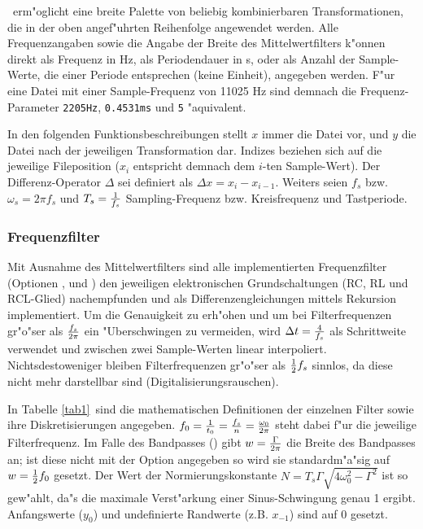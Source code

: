 \wflt\ erm"oglicht eine breite Palette von beliebig kombinierbaren 
Transformationen, die in der oben angef"uhrten Reihenfolge
angewendet werden. Alle Frequenzangaben sowie die Angabe der Breite
des Mittelwertfilters k"onnen direkt als Frequenz in Hz, 
als Periodendauer in s, oder als Anzahl der Sample-Werte, die
einer Periode entsprechen (keine Einheit), angegeben werden.
F"ur eine Datei mit einer Sample-Frequenz von 11025 Hz sind demnach
die Frequenz-Parameter {\tt 2205Hz}, {\tt 0.4531ms} und {\tt 5}
"aquivalent.

In den folgenden Funktionsbeschreibungen stellt $x$ immer die
Datei vor, und $y$ die Datei nach der jeweiligen Transformation dar.
Indizes beziehen sich auf die jeweilige Fileposition ($x_i$ 
entspricht demnach dem $i$-ten Sample-Wert). Der 
Differenz-Operator $\Delta$ sei definiert als $\Delta x = x_i - x_{i-1}$.
Weiters seien $f_s$ bzw. $\omega_s = 2 \pi f_s$ und $T_s = {1\over f_s}$ 
Sampling-Frequenz bzw. Kreisfrequenz und Tastperiode.

\subsubsection{Frequenzfilter}

Mit Ausnahme des Mittelwertfilters sind alle implementierten 
Frequenzfilter (Optionen ,  und ) den
jeweiligen elektronischen Grundschaltungen (RC, RL und
RCL-Glied) nachempfunden und als Differenzengleichungen
mittels Rekursion implementiert. Um die Genauigkeit zu erh"ohen
und um bei Filterfrequenzen gr"o"ser als $f_s\over 2 \pi$ ein
"Uberschwingen zu vermeiden, wird $\Delta t = {4\over f_s}$
als Schrittweite verwendet und zwischen zwei Sample-Werten
linear interpoliert. Nichtsdestoweniger bleiben 
Filterfrequenzen gr"o"ser als ${1\over 2}f_s$ sinnlos, da diese
nicht mehr darstellbar sind (Digitalisierungsrauschen).

In Tabelle \ref{tab1}\ sind die mathematischen Definitionen der
einzelnen Filter sowie ihre Diskretisierungen angegeben. 
$f_0 = {1\over t_0} = {f_s \over n} = {\omega_0 \over 2 \pi}$
steht dabei f"ur die jeweilige Filterfrequenz. Im Falle des
Bandpasses () gibt $w = {\Gamma \over 2 \pi}$ die Breite des
Bandpasses an; ist diese nicht mit der Option 
angegeben so wird sie standardm"a"sig auf $w = {1\over 2} f_0$
gesetzt. Der Wert der Normierungskonstante $ N = T_s \Gamma
\sqrt{4 \omega_0^2-\Gamma^2}$ ist so gew"ahlt, da"s die 
maximale Verst"arkung einer Sinus-Schwingung genau 1 ergibt.
Anfangswerte ($y_0$) und undefinierte Randwerte (z.B. $x_{-1}$) 
sind auf 0 gesetzt.

